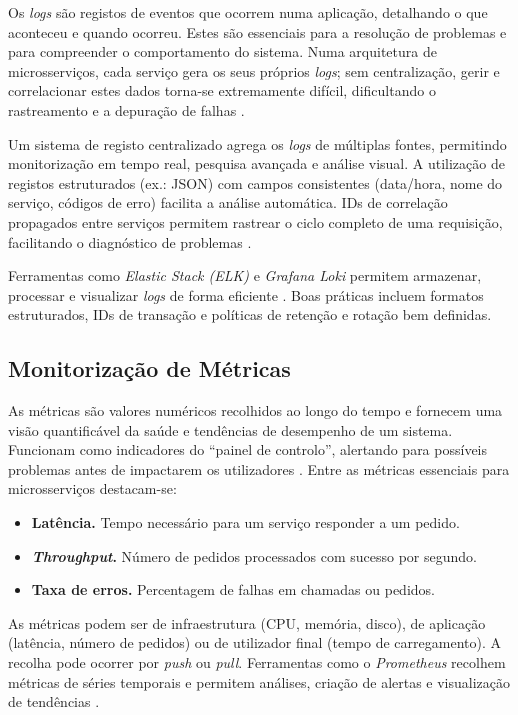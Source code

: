Os \textit{logs} são registos de eventos que ocorrem numa aplicação, detalhando o que aconteceu e quando ocorreu. Estes são essenciais para a resolução de problemas e para compreender o comportamento do sistema. Numa arquitetura de microsserviços, cada serviço gera os seus próprios \textit{logs}; sem centralização, gerir e correlacionar estes dados torna-se extremamente difícil, dificultando o rastreamento e a depuração de falhas \cite{Soldani2022}.

Um sistema de registo centralizado agrega os \textit{logs} de múltiplas fontes, permitindo monitorização em tempo real, pesquisa avançada e análise visual. A utilização de registos estruturados (ex.: JSON) com campos consistentes (data/hora, nome do serviço, códigos de erro) facilita a análise automática. IDs de correlação propagados entre serviços permitem rastrear o ciclo completo de uma requisição, facilitando o diagnóstico de problemas \cite{Fu2012}.

Ferramentas como \textit{Elastic Stack (ELK)} e \textit{Grafana Loki} permitem armazenar, processar e visualizar \textit{logs} de forma eficiente \cite{Bajer2017}. Boas práticas incluem formatos estruturados, IDs de transação e políticas de retenção e rotação bem definidas.

\subsection{Monitorização de Métricas}

As métricas são valores numéricos recolhidos ao longo do tempo e fornecem uma visão quantificável da saúde e tendências de desempenho de um sistema. Funcionam como indicadores do “painel de controlo”, alertando para possíveis problemas antes de impactarem os utilizadores \cite{Burns2015}. Entre as métricas essenciais para microsserviços destacam-se:

\begin{itemize}
    \item \textbf{Latência.} Tempo necessário para um serviço responder a um pedido.
    \item \textbf{\textit{Throughput}.} Número de pedidos processados com sucesso por segundo.
    \item \textbf{Taxa de erros.} Percentagem de falhas em chamadas ou pedidos.
\end{itemize}

As métricas podem ser de infraestrutura (CPU, memória, disco), de aplicação (latência, número de pedidos) ou de utilizador final (tempo de carregamento). A recolha pode ocorrer por \textit{push} ou \textit{pull}. Ferramentas como o \textit{Prometheus} recolhem métricas de séries temporais e permitem análises, criação de alertas e visualização de tendências \cite{Burns2015}.


